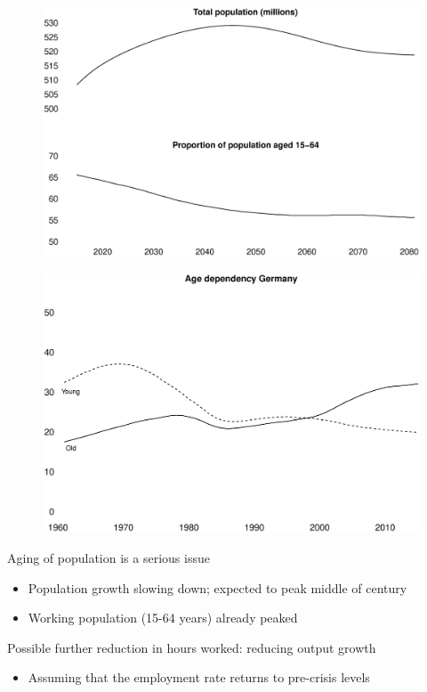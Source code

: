 \documentclass{beamer}
\begin{document}
\begin{frame}
  \begin{figure}
    \includegraphics[scale=.3]{population.eps}
  \end{figure}
\end{frame}

\begin{frame}
  \begin{figure}
    \includegraphics[scale=.3]{german_age_dependency.eps}
  \end{figure}
\end{frame}

\begin{frame}
  Aging of population is a serious issue  
  \begin{itemize}
    \item Population growth slowing down; expected to peak middle of century
    \item Working population (15-64 years) already peaked
  \end{itemize}
  \medskip
  Possible further reduction in hours worked: reducing output growth
  \begin{itemize}
    \item Assuming that the employment rate returns to pre-crisis levels
  \end{itemize}
\end{frame}
\end{document}
